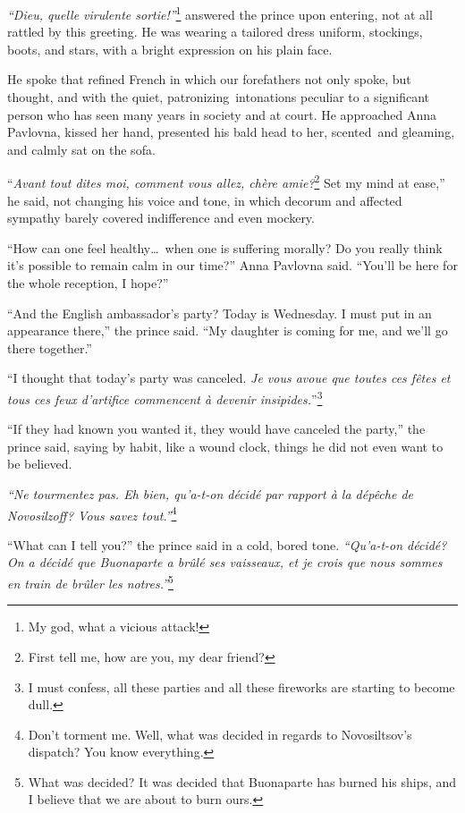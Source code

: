 \textit{``Dieu, quelle virulente sortie!''}\footnote{My god, what a
  vicious attack!} answered the prince upon entering, not at all
rattled by this greeting. He was wearing a tailored dress uniform,
stockings, boots, and stars, with a bright expression on his plain
face.

He spoke that refined French in which our forefathers not only spoke,
but thought, and with the quiet, patronizing\ intonations
peculiar to a significant person who has seen many years in society
and at court. He approached Anna Pavlovna, kissed her hand, presented
his bald head to her, scented\ and gleaming, and calmly sat on
the sofa.

``\textit{Avant tout dites moi, comment vous allez, ch\`ere
  amie?}\footnote{First tell me, how are you, my dear friend?} Set my
mind at ease,'' he said, not changing his voice and tone, in which
decorum and affected sympathy barely covered indifference and even
mockery.

``How can one feel healthy\ldots\ when one is suffering morally? Do
you really think it's possible to remain calm in our time?'' Anna
Pavlovna said. ``You'll be here for the whole reception, I hope?''

``And the English ambassador's party? Today is Wednesday. I must put
in an appearance there,'' the prince said. ``My daughter is coming for
me, and we'll go there together.''

``I thought that today's party was canceled. \textit{Je vous avoue que
  toutes ces f\^etes et tous ces feux d'artifice commencent \`a
  devenir insipides.}''\footnote{I must confess, all these parties and
  all these fireworks are starting to become dull.}

``If they had known you wanted it, they would have canceled the
party,'' the prince said, saying by habit, like a wound clock, things
he did not even want to be believed.

\textit{``Ne tourmentez pas. Eh bien, qu'a-t-on d\'ecid\'e par rapport
  \`a la d\'ep\^eche de Novosilzoff? Vous savez
  tout.''}\footnote{Don't torment me. Well, what was decided in
  regards to Novosiltsov's dispatch? You know everything.}

``What can I tell you?'' the prince said in a cold, bored
tone. \textit{``Qu'a-t-on d\'ecid\'e? On a d\'ecid\'e que Buonaparte a
  br\^ul\'e ses vaisseaux, et je crois que nous sommes en train de
  br\^uler les notres.''}\footnote{What was decided? It was decided
  that Buonaparte has burned his ships, and I believe that we are
  about to burn ours.}

